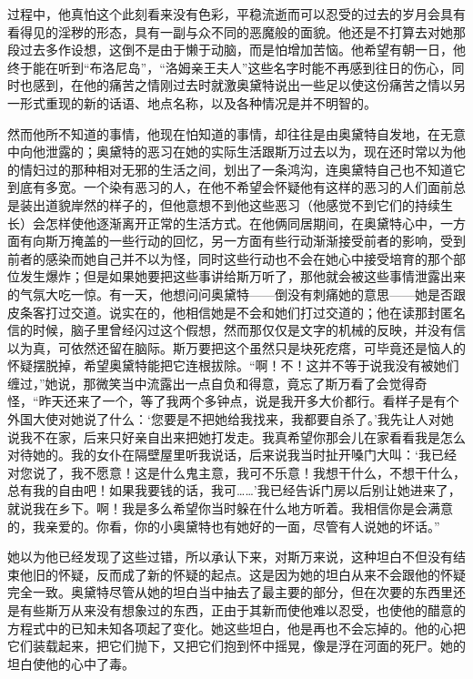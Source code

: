 过程中，他真怕这个此刻看来没有色彩，平稳流逝而可以忍受的过去的岁月会具有看得见的淫秽的形态，具有一副与众不同的恶魔般的面貌。他还是不打算去对她那段过去多作设想，这倒不是由于懒于动脑，而是怕增加苦恼。他希望有朝一日，他终于能在听到“布洛尼岛”，“洛姆亲王夫人”这些名字时能不再感到往日的伤心，同时也感到，在他的痛苦之情刚过去时就激奥黛特说出一些足以使这份痛苦之情以另一形式重现的新的话语、地点名称，以及各种情况是并不明智的。
\par 然而他所不知道的事情，他现在怕知道的事情，却往往是由奥黛特自发地，在无意中向他泄露的；奥黛特的恶习在她的实际生活跟斯万过去以为，现在还时常以为他的情妇过的那种相对无邪的生活之间，划出了一条鸿沟，连奥黛特自己也不知道它到底有多宽。一个染有恶习的人，在他不希望会怀疑他有这样的恶习的人们面前总是装出道貌岸然的样子的，但他意想不到他这些恶习（他感觉不到它们的持续生长）会怎样使他逐渐离开正常的生活方式。在他俩同居期间，在奥黛特心中，一方面有向斯万掩盖的一些行动的回忆，另一方面有些行动渐渐接受前者的影响，受到前者的感染而她自己并不以为怪，同时这些行动也不会在她心中接受培育的那个部位发生爆炸；但是如果她要把这些事讲给斯万听了，那他就会被这些事情泄露出来的气氛大吃一惊。有一天，他想问问奥黛特——倒没有刺痛她的意思——她是否跟皮条客打过交道。说实在的，他相信她是不会和她们打过交道的；他在读那封匿名信的时候，脑子里曾经闪过这个假想，然而那仅仅是文字的机械的反映，并没有信以为真，可依然还留在脑际。斯万要把这个虽然只是块死疙瘩，可毕竟还是恼人的怀疑摆脱掉，希望奥黛特能把它连根拔除。“啊！不！这并不等于说我没有被她们缠过，”她说，那微笑当中流露出一点自负和得意，竟忘了斯万看了会觉得奇怪，“昨天还来了一个，等了我两个多钟点，说是我开多大价都行。看样子是有个外国大使对她说了什么：‘您要是不把她给我找来，我都要自杀了。’我先让人对她说我不在家，后来只好亲自出来把她打发走。我真希望你那会儿在家看看我是怎么对待她的。我的女仆在隔壁屋里听我说话，后来说我当时扯开嗓门大叫：‘我已经对您说了，我不愿意！这是什么鬼主意，我可不乐意！我想干什么，不想干什么，总有我的自由吧！如果我要钱的话，我可……’我已经告诉门房以后别让她进来了，就说我在乡下。啊！我是多么希望你当时躲在什么地方听着。我相信你是会满意的，我亲爱的。你看，你的小奥黛特也有她好的一面，尽管有人说她的坏话。”
\par 她以为他已经发现了这些过错，所以承认下来，对斯万来说，这种坦白不但没有结束他旧的怀疑，反而成了新的怀疑的起点。这是因为她的坦白从来不会跟他的怀疑完全一致。奥黛特尽管从她的坦白当中抽去了最主要的部分，但在次要的东西里还是有些斯万从来没有想象过的东西，正由于其新而使他难以忍受，也使他的醋意的方程式中的已知未知各项起了变化。她这些坦白，他是再也不会忘掉的。他的心把它们装载起来，把它们抛下，又把它们抱到怀中摇晃，像是浮在河面的死尸。她的坦白使他的心中了毒。

